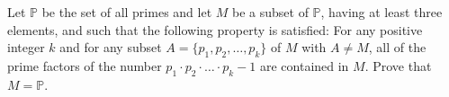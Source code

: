 Let $\mathbb{P}$ be the set of all primes and let $M$ be a subset of $\mathbb{P}$,
having at least three elements, and such that the following property is satisfied:
For any positive integer $k$ and for any subset $A=\{p_1, p_2, \ldots, p_k\}$ of $M$ with $A\neq M$,
all of the prime factors of the number $p_1\cdot p_2 \cdot \ldots \cdot p_k - 1$ are contained in $M$.
Prove that $M=\mathbb{P}$.
